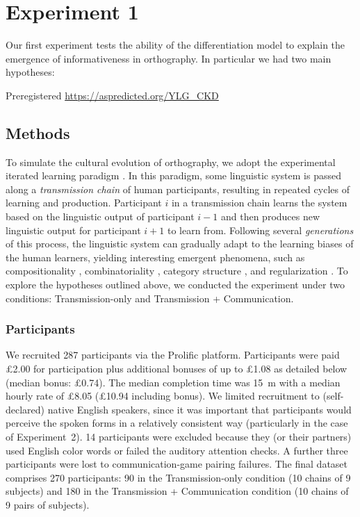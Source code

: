 \documentclass[doc,biblatex]{apa7}
\begin{document}

\section{Experiment 1}

Our first experiment tests the ability of the differentiation model to explain the emergence of informativeness in orthography. In particular we had two main hypotheses:


Preregistered \url{https://aspredicted.org/YLG_CKD}

\subsection{Methods}

To simulate the cultural evolution of orthography, we adopt the experimental iterated learning paradigm \parencite{Kirby:2008, Kirby:2015}. In this paradigm, some linguistic system is passed along a \textit{transmission chain} of human participants, resulting in repeated cycles of learning and production. Participant $i$ in a transmission chain learns the system based on the linguistic output of participant $i-1$ and then produces new linguistic output for participant $i+1$ to learn from. Following several \textit{generations} of this process, the linguistic system can gradually adapt to the learning biases of the human learners, yielding interesting emergent phenomena, such as compositionality \parencite{Kirby:2008, Kirby:2015}, combinatoriality \parencite{Verhoef:2015}, category structure \parencite{Carr:2017, Carr:2020}, and regularization \parencite{Smith:2010, Ferdinand:2019}. To explore the hypotheses outlined above, we conducted the experiment under two conditions: Transmission-only and Transmission + Communication.

\subsubsection{Participants}

We recruited 287 participants via the Prolific platform. Participants were paid £2.00 for participation plus additional bonuses of up to £1.08 as detailed below (median bonus: £0.74). The median completion time was 15~m with a median hourly rate of £8.05 (£10.94 including bonus). We limited recruitment to (self-declared) native English speakers, since it was important that participants would perceive the spoken forms in a relatively consistent way (particularly in the case of Experiment~2). 14 participants were excluded because they (or their partners) used English color words or failed the auditory attention checks. A further three participants were lost to communication-game pairing failures. The final dataset comprises 270 participants: 90 in the Transmission-only condition (10 chains of 9 subjects) and 180 in the Transmission + Communication condition (10 chains of 9 pairs of subjects).
\end{document}
